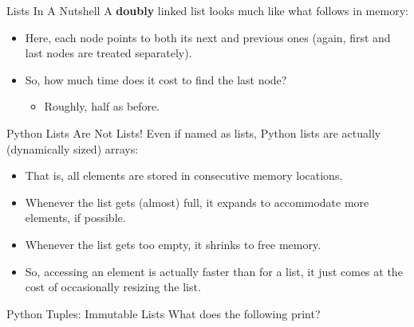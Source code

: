 \documentclass[aspectratio=169, 12pt, xcolor=table]{beamer}
\begin{document}
	\begin{irrelevant}{Lists In A Nutshell}
		A \textbf{doubly} linked list looks much like what follows in memory:
		\begin{center}
		\end{center}\pause
		\begin{itemize}
			\item Here, each node points to both its next and previous ones (again, first and last nodes are treated separately).\pause
			\item So, how much time does it cost to find the last node?\pause
			\begin{itemize}
				\item Roughly, half as before.
			\end{itemize}
		\end{itemize}
	\end{irrelevant}

	\begin{irrelevant}{Python Lists Are Not Lists!}
		Even if named as lists, Python lists are actually (dynamically sized) arrays:
		\begin{itemize}
			\item That is, all elements are stored in consecutive memory locations.
			\item Whenever the list gets (almost) full, it expands to accommodate more elements, if possible.
			\item Whenever the list gets too empty, it shrinks to free memory.
			\item So, accessing an element is actually faster than for a list, it just comes at the cost of occasionally resizing the list.
		\end{itemize}
	\end{irrelevant}

	\begin{frame}{Python Tuples: Immutable Lists}
		What does the following print?
		
	\end{frame}
	
\end{document}
